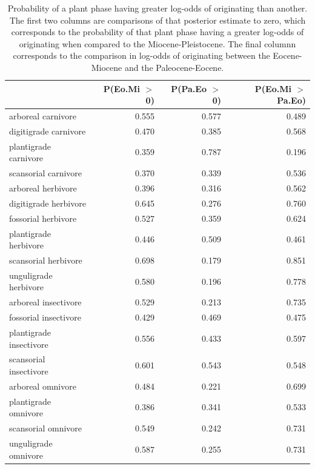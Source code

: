 \documentclass[12pt,letterpaper]{article}
\begin{document}
\begin{table}[ht]
  \centering
  \caption[Posterior probablity estimates of differences in origination by plant phase]{Probability of a plant phase having greater log-odds of originating than another. The first two columns are comparisons of that posterior estimate to zero, which corresponds to the probability of that plant phase having a greater log-odds of originating when compared to the Miocene-Pleistocene. The final columnn corresponds to the comparison in log-odds of originating between the Eocene-Miocene and the Paleocene-Eocene.} 
  \label{tab:origin_plant}
  \begin{tabular}{ l r r r }
    \hline
    & P(Eo.Mi $>$ 0) & P(Pa.Eo $>$ 0) & P(Eo.Mi $>$ Pa.Eo) \\ 
    \hline
    arboreal carnivore & 0.555 & 0.577 & 0.489 \\ 
    digitigrade carnivore & 0.470 & 0.385 & 0.568 \\ 
    plantigrade carnivore & 0.359 & 0.787 & 0.196 \\ 
    scansorial carnivore & 0.370 & 0.339 & 0.536 \\ 
    arboreal herbivore & 0.396 & 0.316 & 0.562 \\ 
    digitigrade herbivore & 0.645 & 0.276 & 0.760 \\ 
    fossorial herbivore & 0.527 & 0.359 & 0.624 \\ 
    plantigrade herbivore & 0.446 & 0.509 & 0.461 \\ 
    scansorial herbivore & 0.698 & 0.179 & 0.851 \\ 
    unguligrade herbivore & 0.580 & 0.196 & 0.778 \\ 
    arboreal insectivore & 0.529 & 0.213 & 0.735 \\ 
    fossorial insectivore & 0.429 & 0.469 & 0.475 \\ 
    plantigrade insectivore & 0.556 & 0.433 & 0.597 \\ 
    scansorial insectivore & 0.601 & 0.543 & 0.548 \\ 
    arboreal omnivore & 0.484 & 0.221 & 0.699 \\ 
    plantigrade omnivore & 0.386 & 0.341 & 0.533 \\ 
    scansorial omnivore & 0.549 & 0.242 & 0.731 \\ 
    unguligrade omnivore & 0.587 & 0.255 & 0.731 \\ 
    \hline
  \end{tabular}
\end{table}
\end{document}
